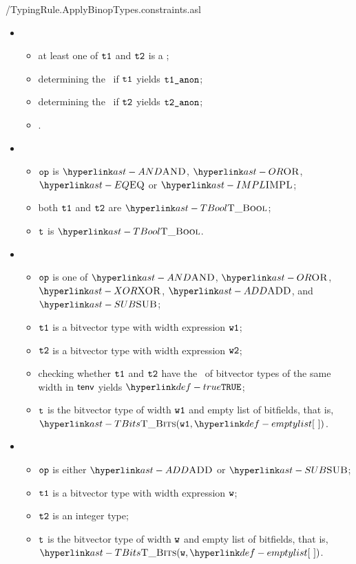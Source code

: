 \pagebreak
{}
          {\typingtests/TypingRule.ApplyBinopTypes.constraints.asl}

\ProseParagraph
\OneApplies
\begin{itemize}
  \item {}
  \begin{itemize}
    \item at least one of $\texttt{t1}$ and $\texttt{t2}$ is a \namedtype;
    \item determining the \underlyingtype\ if $\texttt{t1}$ yields $\vtoneanon$\ProseOrTypeError;
    \item determining the \underlyingtype\ if $\texttt{t2}$ yields $\vttwoanon$\ProseOrTypeError;
    \item \Proseapplybinoptypes{$\tenv$}{$\op$}{$\vtoneanon$}{$\vttwoanon$}{$\vt$\ProseOrTypeError}.
  \end{itemize}

  \item {}
  \begin{itemize}
    \item $\op$ is $\AND$, $\OR$, $\EQ$ or $\IMPL$;
    \item both $\texttt{t1}$ and $\texttt{t2}$ are $\TBool$;
    \item $\vt$ is $\TBool$.
  \end{itemize}

  \item {}
  \begin{itemize}
    \item $\op$ is one of $\AND$, $\OR$, $\XOR$, $\ADD$, and $\SUB$;
    \item $\texttt{t1}$ is a bitvector type with width expression $\texttt{w1}$;
    \item $\texttt{t2}$ is a bitvector type with width expression $\texttt{w2}$;
    \item checking whether $\texttt{t1}$ and $\texttt{t2}$ have the \structure\ of bitvector types
          of the same width in $\tenv$ yields $\True$\ProseOrTypeError;
    \item $\vt$ is the bitvector type of width $\texttt{w1}$ and empty list of bitfields, that is, \\ $\TBits(\vwone, \emptylist)$.
  \end{itemize}

  \item {}
  \begin{itemize}
    \item $\op$ is either $\ADD$ or $\SUB$;
    \item $\texttt{t1}$ is a bitvector type with width expression $\texttt{w}$;
    \item $\texttt{t2}$ is an integer type;
    \item $\vt$ is the bitvector type of width $\texttt{w}$ and empty list of bitfields, that is, \\ $\TBits(\vw, \emptylist)$.
  \end{itemize}


\end{itemize}
